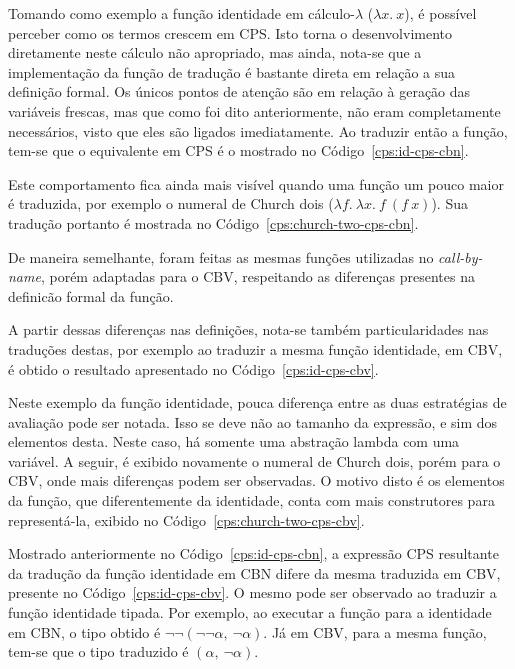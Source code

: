 Tomando como exemplo a função identidade em cálculo-$\lambda$ ($\lambda x.\ x$), é possível perceber como os termos crescem em CPS.
Isto torna o desenvolvimento diretamente neste cálculo não apropriado, mas ainda, nota-se que a implementação da função de tradução é bastante direta em relação a sua definição formal.
Os únicos pontos de atenção são em relação à geração das variáveis frescas, mas que como foi dito anteriormente, não eram completamente necessários, visto que eles são ligados imediatamente.
Ao traduzir então a função, tem-se que o equivalente em CPS é o mostrado no Código~\ref{cps:id-cps-cbn}.

Este comportamento fica ainda mais visível quando uma função um pouco maior é traduzida, por exemplo o numeral de Church dois ($\lambda f.\ \lambda x.\ f\ (f\ x)$).
Sua tradução portanto é mostrada no Código~\ref{cps:church-two-cps-cbn}.

De maneira semelhante, foram feitas as mesmas funções utilizadas no \textit{call-by-name}, porém adaptadas para o CBV, respeitando as diferenças presentes na definicão formal da função.

A partir dessas diferenças nas definições, nota-se também particularidades nas traduções destas, por exemplo ao traduzir a mesma função identidade, em CBV, é obtido o resultado apresentado no Código~\ref{cps:id-cps-cbv}.

Neste exemplo da função identidade, pouca diferença entre as duas estratégias de avaliação pode ser notada.
Isso se deve não ao tamanho da expressão, e sim dos elementos desta.
Neste caso, há somente uma abstração lambda com uma variável.
A seguir, é exibido novamente o numeral de Church dois, porém para o CBV, onde mais diferenças podem ser observadas.
O motivo disto é os elementos da função, que diferentemente da identidade, conta com mais construtores para representá-la, exibido no Código~\ref{cps:church-two-cps-cbv}.


Mostrado anteriormente no Código~\ref{cps:id-cps-cbn}, a expressão CPS resultante da tradução da função identidade em CBN difere da mesma traduzida em CBV, presente no Código~\ref{cps:id-cps-cbv}.
O mesmo pode ser observado ao traduzir a função identidade tipada.
Por exemplo, ao executar a função para a identidade em CBN, o tipo obtido é $\neg\neg(\neg\neg\alpha,\ \neg\alpha)$.
Já em CBV, para a mesma função, tem-se que o tipo traduzido é $(\alpha,\ \neg\alpha)$.

